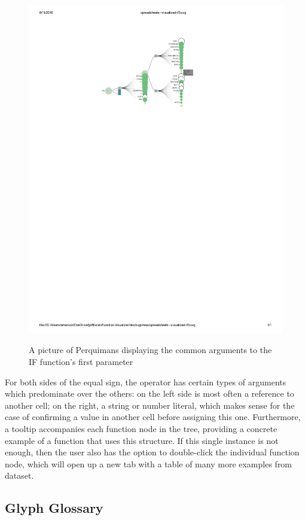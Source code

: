 \documentclass[conference]{IEEEtran}
\newcommand{\toolname}{Perquimans\xspace} \newcommand{\toolnameend}{Perquimans}
\begin{document}
	\begin{figure}[t] \centering \includegraphics[scale=.5]{IFargslabel}
		\caption{A picture of \toolname displaying the common arguments to the IF
			function's first parameter} \centering \label{fig:fullpic} \end{figure}
	
	For both sides of the equal sign, the operator has certain types of arguments
	which predominate over the others: on the left side is most often a reference
	to another cell; on the right, a string or number literal, which makes sense
	for the case of confirming a value in another cell before assigning this one.
	Furthermore, a tooltip accompanies each function node in the tree, providing a
	concrete example of a function that uses this structure. If this single
	instance is not enough, then the user also has the option to double-click the
	individual function node, which will open up a new tab with a table of many
	more examples from dataset.
	
	\subsection{Glyph Glossary}
	
\end{document}

